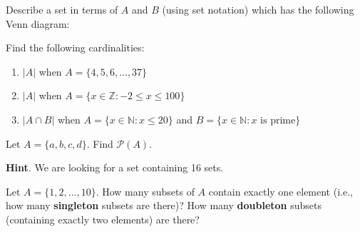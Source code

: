 \documentclass[10pt,]{book}
\newcommand{\terminology}[1]{\textbf{#1}}
\theoremstyle{plain}
\theoremstyle{definition}
\theoremstyle{definition}
\theoremstyle{definition}
\theoremstyle{definition}
\numberwithin{equation}{chapter}
\def\N{\mathbb N}
\def\Z{\mathbb Z}
\def\pow{\mathcal P}
\def\st{:}
\begin{document}
\begin{divisionexercise}{8}\hypertarget{exercise-194}{}
\hypertarget{p-1678}{}%
Describe a set in terms of \(A\) and \(B\) (using set notation) which has the following Venn diagram:%
\begin{sidebyside}{1}{0.4}{0.4}{0}
\begin{sbspanel}{0.2}
\end{sbspanel}
\end{sidebyside}
\end{divisionexercise}%
\begin{divisionexercise}{9}\hypertarget{exercise-195}{}
\hypertarget{p-1679}{}%
Find the following cardinalities: \leavevmode%
\begin{enumerate}[label=(\alph*)]
\item\hypertarget{li-520}{}\(|A|\) when \(A = \{4,5,6,\ldots,37\}\)%
\item\hypertarget{li-521}{}\(|A|\) when \(A = \{x \in \Z \st -2 \le x \le 100\}\)%
\item\hypertarget{li-522}{}\(|A \cap B|\) when \(A = \{x \in \N \st x \le 20\}\) and \(B = \{x \in \N \st x \mbox{ is prime} \}\)%
\end{enumerate}
%
\end{divisionexercise}%
\begin{divisionexercise}{10}\hypertarget{exercise-196}{}
\hypertarget{p-1684}{}%
Let \(A = \{a, b, c, d\}\). Find \(\pow(A)\).%
\par\smallskip%
\noindent\textbf{Hint}.\hypertarget{hint-92}{}\quad%
\hypertarget{p-1685}{}%
We are looking for a set containing 16 sets.%
\end{divisionexercise}%
\begin{divisionexercise}{11}\hypertarget{exercise-197}{}
\hypertarget{p-1686}{}%
Let \(A = \{1,2,\ldots, 10\}\). How many subsets of \(A\) contain exactly one element (i.e., how many \terminology{singleton} subsets are there)? How many \terminology{doubleton} subsets (containing exactly two elements) are there?%
\end{divisionexercise}%
\end{document}
